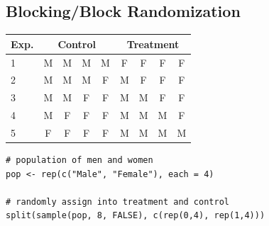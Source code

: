 \questions

\subsection{Blocking/Block Randomization}



\begin{frame}[fragile]

\begin{center}
\begin{tabular}{lcccccccc}
Exp. & \multicolumn{4}{c}{Control} & \multicolumn{4}{c}{Treatment} \\ \midrule
1 & M & M & M & M & F & F & F & F \\
2 & M & M & M & F & M & F & F & F \\
3 & M & M & F & F & M & M & F & F \\
4 & M & F & F & F & M & M & M & F \\
5 & F & F & F & F & M & M & M & M \\ \bottomrule
\end{tabular}
\end{center}


{\scriptsize
\begin{verbatim}
# population of men and women
pop <- rep(c("Male", "Female"), each = 4)

# randomly assign into treatment and control
split(sample(pop, 8, FALSE), c(rep(0,4), rep(1,4)))
\end{verbatim}
}

\end{frame}


